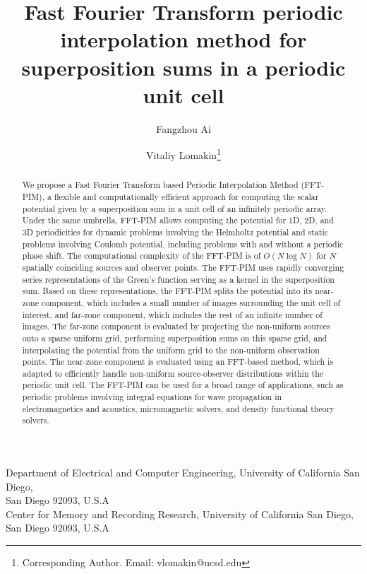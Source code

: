 \documentclass{article}
\date{}
\begin{document}
\title{Fast Fourier Transform periodic interpolation method for superposition sums in a periodic unit cell}

\author{Fangzhou Ai \and Vitaliy Lomakin\thanks{Corresponding Author. Email: vlomakin@ucsd.edu}}

\maketitle

\begin{center}
    Department of Electrical and Computer Engineering, University of California San Diego, \\
    San Diego 92093, U.S.A \\
    Center for Memory and Recording Research, University of California San Diego, \\
    San Diego 92093, U.S.A
\end{center}

\begin{abstract}
We propose a Fast Fourier Transform based Periodic Interpolation Method (FFT-PIM), a flexible and computationally efficient approach for computing the scalar potential given by a superposition sum in a unit cell of an infinitely periodic array. Under the same umbrella, FFT-PIM allows computing the potential for 1D, 2D, and 3D periodicities for dynamic problems involving the Helmholtz potential and static problems involving Coulomb potential, including problems with and without a periodic phase shift. The computational complexity of the FFT-PIM is of $O(N \log N)$ for $N$ spatially coinciding sources and observer points. The FFT-PIM uses rapidly converging series representations of the Green's function serving as a kernel in the superposition sum. Based on these representations, the FFT-PIM splits the potential into its near-zone component, which includes a small number of images surrounding the unit cell of interest, and far-zone component, which includes the rest of an infinite number of images. The far-zone component is evaluated by projecting the non-uniform sources onto a sparse uniform grid, performing superposition sums on this sparse grid, and interpolating the potential from the uniform grid to the non-uniform observation points. The near-zone component is evaluated using an FFT-based method, which is adapted to efficiently handle non-uniform source-observer distributions within the periodic unit cell. The FFT-PIM can be used for a broad range of applications, such as periodic problems involving integral equations for wave propagation in electromagnetics and acoustics, micromagnetic solvers, and density functional theory solvers. 
\end{abstract}
\end{document}

